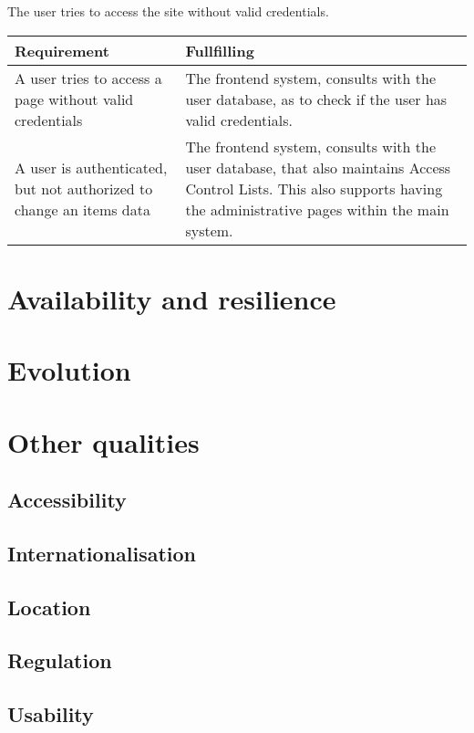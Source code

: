 The user tries to access the site without valid credentials.

\begin{table}
\centering
\begin{tabular}{p{5cm} | p{7cm}}
Requirement & Fullfilling \\ \hline
A user tries to access a page without valid credentials &
    The frontend system, consults with the user database, as to check if the
    user has valid credentials. \\ \hline
A user is authenticated, but not authorized to change an items data &
    The frontend system, consults with the user database, that also maintains
    Access Control Lists. This also supports having the administrative pages
    within the main system. \\
\end{tabular}
\end{table}

\section{Availability and resilience}
\label{sec:avail-resil}



\section{Evolution}
\label{sec:evolution}


\section{Other qualities}
\label{sec:other-qualities}

\subsection{Accessibility}
\label{sec:accessibility}


\subsection{Internationalisation}
\label{sec:internationalisation}


\subsection{Location}
\label{sec:location}


\subsection{Regulation}
\label{sec:regulation}


\subsection{Usability}
\label{sec:usability}


